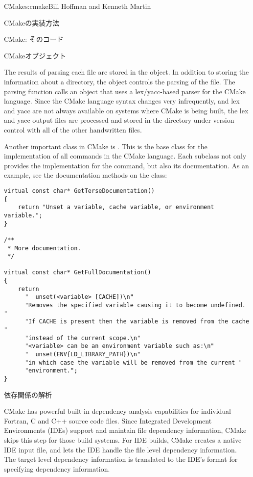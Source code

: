 \begin{aosachapter}{CMake}{s:cmake}{Bill Hoffman and Kenneth Martin}
\begin{aosasect1}{CMakeの実装方法}
\begin{aosasect2}{CMake: そのコード}
\begin{aosasect3}{CMakeオブジェクト}

The results of parsing each  file are stored in
the  object. In addition to storing the information
about a directory, the  object controls the parsing
of the  file. The parsing function calls an
object that uses a lex/yacc-based parser for the CMake language.
Since the CMake language syntax changes very infrequently, and lex and yacc
are not always available on systems where CMake is being built, the
lex and yacc output files are processed and stored in the
 directory under version control with all of the other
handwritten files.

Another important class in CMake is . This is the base
class for the implementation of all commands in the CMake
language. Each subclass not only provides the implementation for the
command, but also its documentation. As an example, see the
documentation methods on the  class:

\pagebreak

\begin{verbatim}
virtual const char* GetTerseDocumentation()
{
    return "Unset a variable, cache variable, or environment variable.";
}

/**
 * More documentation.
 */

virtual const char* GetFullDocumentation()
{
    return
      "  unset(<variable> [CACHE])\n"
      "Removes the specified variable causing it to become undefined.  "
      "If CACHE is present then the variable is removed from the cache "
      "instead of the current scope.\n"
      "<variable> can be an environment variable such as:\n"
      "  unset(ENV{LD_LIBRARY_PATH})\n"
      "in which case the variable will be removed from the current "
      "environment.";
}
\end{verbatim}

\end{aosasect3}

\begin{aosasect3}{依存関係の解析}

CMake has powerful built-in dependency analysis capabilities for
individual Fortran, C and C++ source code files. Since Integrated
Development Environments (IDEs) support and maintain file dependency
information, CMake skips this step for those build systems. For IDE
builds, CMake creates a native IDE input file, and lets the IDE handle
the file level dependency information. The target level dependency information
is translated to the IDE's format for specifying dependency information.


\end{aosasect3}
\end{aosasect2}
\end{aosasect1}
\end{aosachapter}
